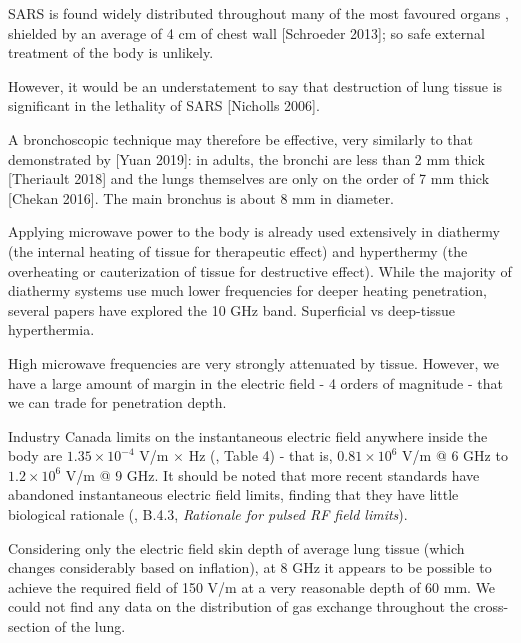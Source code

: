 \documentclass[paper.tex]{subfiles}
\begin{document}
SARS is found widely distributed throughout many of the most favoured organs \cite{Organ2004}, shielded by an average of 4 cm of chest wall [Schroeder 2013]; so safe external treatment of the body is unlikely.

\cite{neuroinvasive2020} \cite{situ2020}

However, it would be an understatement to say that destruction of lung tissue is significant in the lethality of SARS [Nicholls 2006]. 

A bronchoscopic technique may therefore be effective, very similarly to that demonstrated by [Yuan 2019]: in adults, the bronchi are less than 2 mm thick [Theriault 2018] and the lungs themselves are only on the order of 7 mm thick [Chekan 2016]. The main bronchus is about 8 mm in diameter.



Applying microwave power to the body is already used extensively in diathermy (the internal heating of tissue for therapeutic effect) and hyperthermy (the overheating or cauterization of tissue for destructive effect). While the majority of diathermy systems use much lower frequencies for deeper heating penetration, several papers have explored the 10 GHz band. Superficial vs deep-tissue hyperthermia.

High microwave frequencies are very strongly attenuated by tissue. However, we have a large amount of margin in the electric field - 4 orders of magnitude - that we can trade for penetration depth.

Industry Canada limits on the instantaneous electric field anywhere inside the body are $1.35 \times 10^{-4}$ V/m $\times$ Hz (\cite{RSS1022015}, Table 4) - that is, $0.81 \times 10^6$ V/m @ 6 GHz to $1.2 \times 10^6$ V/m @ 9 GHz. It should be noted that more recent standards have abandoned instantaneous electric field limits, finding that they have little biological rationale (\cite{C95}, B.4.3, {\it Rationale for pulsed RF field limits}).\footnotemark

 



Considering only the electric field skin depth\footnotemark\cite{Safety2001}\cite{Physical1982} of average lung tissue\cite{gabriel1996compilation}\cite{Dielectricb}\cite{Dielectric}\cite{Tissue2018} (which changes considerably based on inflation), at 8 GHz it appears to be possible to achieve the required field of 150 V/m at a very reasonable depth of 60 mm. We could not find any data on the distribution of gas exchange throughout the cross-section of the lung.
\end{document}
